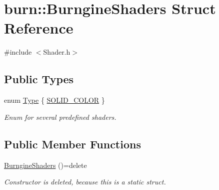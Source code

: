 \hypertarget{structburn_1_1_burngine_shaders}{\section{burn\-:\-:Burngine\-Shaders Struct Reference}
\label{structburn_1_1_burngine_shaders}
}


{\ttfamily \#include $<$Shader.\-h$>$}

\subsection*{Public Types}
\begin{DoxyCompactItemize}
\item 
enum \hyperlink{structburn_1_1_burngine_shaders_a2c339d4b838b7efe94ba8ef7f480ef41}{Type} \{ \hyperlink{structburn_1_1_burngine_shaders_a2c339d4b838b7efe94ba8ef7f480ef41a88513d98f02053992a4d753db14104e1}{S\-O\-L\-I\-D\-\_\-\-C\-O\-L\-O\-R}
 \}
\begin{DoxyCompactList}\small\item\em Enum for several predefined shaders. \end{DoxyCompactList}\end{DoxyCompactItemize}
\subsection*{Public Member Functions}
\begin{DoxyCompactItemize}
\item 
\hyperlink{structburn_1_1_burngine_shaders_a7839e417fb8b954b87ece696e48041eb}{Burngine\-Shaders} ()=delete
\begin{DoxyCompactList}\small\item\em Constructor is deleted, because this is a static struct. \end{DoxyCompactList}\end{DoxyCompactItemize}
